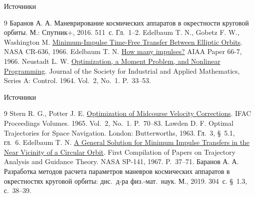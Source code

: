 \documentclass[11pt,aspectratio=169,t]{beamer}
\begin{document}
\begin{frame}{Источники}
\relax
{}
\begin{thebibliography}{9}
Баранов А. А. Маневрирование космических аппаратов в окрестности круговой орбиты.
М.: Спутник+, 2016. 511~с. Гл.~1--2.
Edelbaum T. N., Gobetz F. W., Washington M.
\href{https://ntrs.nasa.gov/citations/19660030604}{Minimum-Impulse Time-Free Transfer Between Elliptic Orbits}.
NASA CR-636, 1966.
Edelbaum T. N.
\href{https://doi.org/10.2514/6.1966-7}{How many impulses?}
AIAA Paper 66-7, 1966.
Neustadt L. W.
\href{https://doi.org/10.1137/0302004}{Optimization, a Moment Problem, and Nonlinear Programming}.
Journal of the Society for Industrial and Applied Mathematics, Series A: Control.
1964. Vol.~2, No.~1. P.~33--53.
\end{thebibliography}
\end{frame}

\begin{frame}{Источники}
\relax
{}
\begin{thebibliography}{9}
\setcounter{enumiv}{4}
Stern R. G., Potter J. E.
\href{https://www.sciencedirect.com/science/article/abs/pii/S1474667017690700}{Optimization of Midcourse Velocity Corrections}.
IFAC Proceedings Volumes. 1965. Vol.~2, No.~1. P.~70--83.
Lawden D. F. Optimal Trajectories for Space Navigation.
London: Butterworths, 1963. Гл.~3, \S~5.1, гл.~6.
Edelbaum T. N.
\href{https://ntrs.nasa.gov/citations/19670020044}{A General Solution for Minimum Impulse Transfers in the Near Vicinity of a Circular Orbit}.
First Compilation of Papers on Trajectory Analysis and Guidance Theory.
NASA SP-141, 1967. P.~37--71.
Баранов А. А. Разработка методов расчета параметров маневров космических аппаратов
в окрестностях круговой орбиты: дис.\ д-ра физ.-мат.\ наук. М., 2019. 304~с.
\S~1.3, с.~38--39.
\end{thebibliography}
\end{frame}
\end{document}
